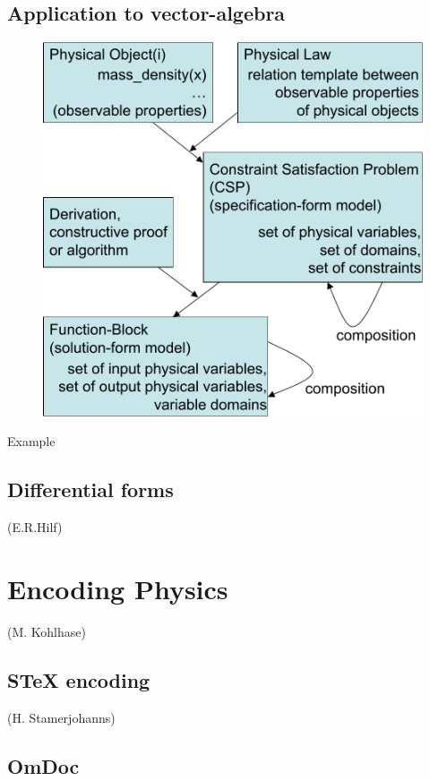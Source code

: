\documentclass[12pt]{article}
\begin{document}
\subsection{Application to vector-algebra}
\begin{figure}
  \begin{center} %
    \includegraphics[clip=true, viewport=0 0 452 445, scale=0.9]{./MathModelOfMathModeling.pdf}
  \end{center}
\end{figure}
Example
\subsection{Differential forms}
(E.R.Hilf)

\section{Encoding Physics }
(M. Kohlhase)
\subsection{STeX encoding}
(H. Stamerjohanns)
\subsection{OmDoc}
\end{document}
